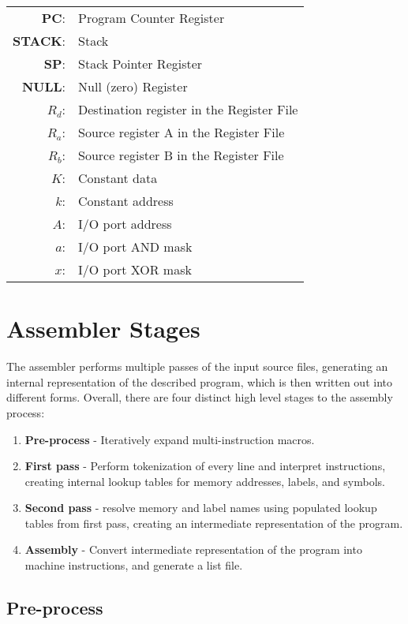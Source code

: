 \documentclass[12pt,twoside]{report}
\begin{document}
\begin{tabular}{ | r | l | }
  \hline
  \textbf{PC}: & Program Counter Register \\
  \textbf{STACK}: & Stack \\
  \textbf{SP}: & Stack Pointer Register \\
  \textbf{NULL}: & Null (zero) Register \\
  \textbf{$R_d$}: & Destination register in the Register File \\
  \textbf{$R_a$}: & Source register A in the Register File \\
  \textbf{$R_b$}: & Source register B in the Register File \\
  \textbf{$K$}: & Constant data \\
  \textbf{$k$}: & Constant address \\
  \textbf{$A$}: & I/O port address \\
  \textbf{$a$}: & I/O port AND mask \\
  \textbf{$x$}: & I/O port XOR mask \\
  \hline
\end{tabular}

\section{Assembler Stages}

The assembler performs multiple passes of the input source files,
generating an internal representation of the described program, which
is then written out into different forms. Overall, there are four
distinct high level stages to the assembly process:

\begin{enumerate}
\item \textbf{Pre-process} - Iteratively expand multi-instruction macros.
\item \textbf{First pass} - Perform tokenization of every line and
  interpret instructions, creating internal lookup tables for memory
  addresses, labels, and symbols.
\item \textbf{Second pass} - resolve memory and label names using
  populated lookup tables from first pass, creating an intermediate
  representation of the program.
\item \textbf{Assembly} - Convert intermediate representation of the
  program into machine instructions, and generate a list file.
\end{enumerate}

\subsection{Pre-process}
\end{document}
